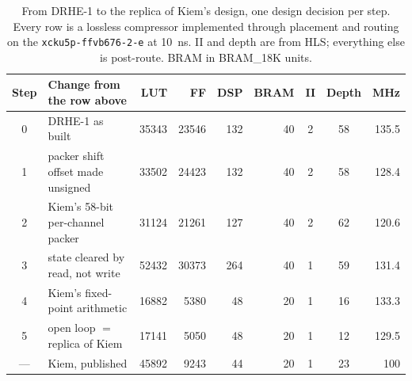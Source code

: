 \begin{table}[htbp]
\centering
\caption[From DRHE-1 to the replica, one change per step]{From DRHE-1 to the replica of Kiem's design, one design decision per step. Every row is a lossless compressor implemented through placement and routing on the \texttt{xcku5p-ffvb676-2-e} at \SI{10}{\nano\second}. II and depth are from HLS; everything else is post-route. BRAM in BRAM\_18K units.}
\label{tab:abl}
\small
\setlength{\tabcolsep}{4pt}
\begin{tabular}{@{}cl rrrr cc r@{}}
\toprule
Step & Change from the row above & LUT & FF & DSP & BRAM & II & Depth & MHz\\
\midrule
0 & DRHE-1 as built & \num{35343} & \num{23546} & \num{132} & \num{40} & \num{2} & \num{58} & \num{135.5}\\
1 & packer shift offset made unsigned & \num{33502} & \num{24423} & \num{132} & \num{40} & \num{2} & \num{58} & \num{128.4}\\
2 & Kiem's 58-bit per-channel packer & \num{31124} & \num{21261} & \num{127} & \num{40} & \num{2} & \num{62} & \num{120.6}\\
3 & state cleared by read, not write & \num{52432} & \num{30373} & \num{264} & \num{40} & \num{1} & \num{59} & \num{131.4}\\
4 & Kiem's fixed-point arithmetic & \num{16882} & \num{5380} & \num{48} & \num{20} & \num{1} & \num{16} & \num{133.3}\\
5 & open loop $=$ replica of Kiem & \num{17141} & \num{5050} & \num{48} & \num{20} & \num{1} & \num{12} & \num{129.5}\\
\midrule
--- & Kiem, published \cite{kiem2025} & \num{45892} & \num{9243} & \num{44} & \num{20} & 1 & 23 & 100\\
\bottomrule
\end{tabular}
\end{table}
